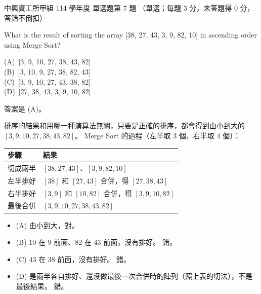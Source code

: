 \begin{pastexam}[label={px:nchu-114-dsa-07}]{中興資工所甲組 114 學年度 單選題第 7 題}
（單選；每題 3 分，未答題得 0 分，答錯不倒扣）

What is the result of sorting the array [38, 27, 43, 3, 9, 82, 10] in ascending order using Merge Sort?

(A)~[3, 9, 10, 27, 38, 43, 82]\\
(B)~[3, 10, 9, 27, 38, 82, 43]\\
(C)~[3, 9, 10, 27, 43, 38, 82]\\
(D)~[27, 38, 43, 3, 9, 10, 82]
\end{pastexam}

\begin{pastsoln}
答案是 (A)。

排序的結果和用哪一種演算法無關，只要是正確的排序，都會得到由小到大的
$[3, 9, 10, 27, 38, 43, 82]$。 Merge Sort 的過程（左半取 $3$ 個、右半取 $4$ 個）：
\begin{center}
\begin{tabular}{ll}
\toprule
步驟 & 結果 \\
\midrule
切成兩半 & $[38, 27, 43]$、$[3, 9, 82, 10]$ \\
左半排好 & $[38]$ 和 $[27, 43]$ 合併，得 $[27, 38, 43]$ \\
右半排好 & $[3, 9]$ 和 $[10, 82]$ 合併，得 $[3, 9, 10, 82]$ \\
最後合併 & $[3, 9, 10, 27, 38, 43, 82]$ \\
\bottomrule
\end{tabular}
\end{center}
\begin{itemize}
\item (A) 由小到大，對。
\item (B) $10$ 在 $9$ 前面、$82$ 在 $43$ 前面，沒有排好。 錯。
\item (C) $43$ 在 $38$ 前面，沒有排好。 錯。
\item (D) 是兩半各自排好、還沒做最後一次合併時的陣列（照上表的切法），不是最後結果。 錯。
\end{itemize}
\end{pastsoln}
